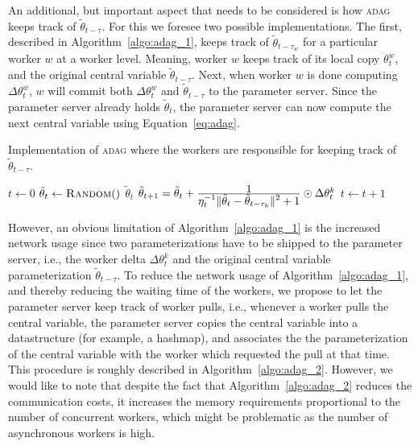 An additional, but important aspect that needs to be considered is how \textsc{adag} keeps track of $\tilde{\theta}_{t - \tau}$. For this we foresee two possible implementations. The first, described in Algorithm~\ref{algo:adag_1}, keeps track of $\tilde{\theta}_{t - \tau_w}$ for a particular worker $w$ at a worker level. Meaning, worker $w$ keeps track of its local copy $\theta_t^w$, and the original central variable $\tilde{\theta}_{t-\tau}$. Next, when worker $w$ is done computing $\Delta\theta^w_t$, $w$ will commit both $\Delta\theta^w_t$ and $\tilde{\theta}_{t - \tau}$ to the parameter server. Since the parameter server already holds $\tilde{\theta}_{t}$, the parameter server can now compute the next central variable using Equation~\ref{eq:adag}.

\begin{algorithm}[H]
  \caption{Implementation of \textsc{adag} where the workers are responsible for keeping track of $\tilde{\theta}_{t - \tau}$.}
  \label{algo:adag_1}
  \begin{algorithmic}[1]
    \State $t \gets 0$ 
    \State $\tilde{\theta}_t \gets \Call{Random}$
    \State
     
    \State \Return $\tilde{\theta}_{t}$
    \EndProcedure
    \State
    \State $\tilde{\theta}_{t + 1} = \tilde{\theta}_t + \frac{\displaystyle 1}{\displaystyle \eta_t^{-1}\|\tilde{\theta}_t - \tilde{\theta}_{t - \tau_k}\|^2 + 1} \odot \Delta\theta^k_t$
    \State $t \gets t + 1$
    \EndProcedure
    \State
    \EndProcedure
  \end{algorithmic}
\end{algorithm}

However, an obvious limitation of Algorithm~\ref{algo:adag_1} is the increased network usage since two parameterizations have to be shipped to the parameter server, i.e., the worker delta $\Delta\theta^k_t$ and the original central variable parameterization $\tilde{\theta}_{t - \tau}$. To reduce the network usage of Algorithm~\ref{algo:adag_1}, and thereby reducing the waiting time of the workers, we propose to let the parameter server keep track of worker pulls, i.e., whenever a worker pulls the central variable, the parameter server copies the central variable into a datastructure (for example, a hashmap), and associates the the parameterization of the central variable with the worker which requested the pull at that time. This procedure is roughly described in Algorithm~\ref{algo:adag_2}. However, we would like to note that despite the fact that Algorithm~\ref{algo:adag_2} reduces the communication costs, it increases the memory requirements proportional to the number of concurrent workers, which might be problematic as the number of asynchronous workers is high.

